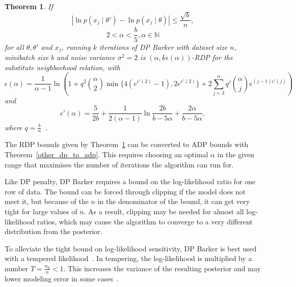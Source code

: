 \documentclass[english,twoside,openright]{HYgraduMLDS}
\newtheorem{theorem}[lemma]{Theorem}
\newcommand{\N}{\mathbb{N}}
\begin{document}
\begin{theorem}\label{dp_barker_theorem}
    If
    \[
        |\ln p(x_j\mid \theta') - \ln p(x_j\mid \theta)| \leq \frac{\sqrt{b}}{n},
    \]
    \[
        2 < \alpha < \frac{b}{5}, \alpha \in \N
    \]
    for all \(\theta, \theta'\) and \(x_{j}\),
    running \(k\) iterations of DP Barker with dataset size \(n\),
    minibatch size \(b\) and noise variance \(\sigma^{2} = 2\)
    is \((\alpha, k\epsilon(\alpha))\)-RDP for the substitute neighborhood
    relation, with
    \[
        \epsilon(\alpha) = \frac{1}{\alpha - 1}\ln \left(
        1 + q^2\binom{\alpha}{2}\min\{4(e^{\epsilon'(2)} - 1), 2e^{\epsilon'(2)}\}
        + 2 \sum_{j=3}^\alpha q^j\binom{\alpha}{j}e^{(j-1)\epsilon'(j)}\right)
    \]
    and 
    \[
        \epsilon'(\alpha) = \frac{5}{2b} + \frac{1}{2(\alpha - 1)}
        \ln \frac{2b}{b - 5\alpha} + \frac{2\alpha}{b - 5\alpha},
    \]
    where \(q = \frac{b}{n}\)~\cite{HeikkilaJDH19}.
\end{theorem}
The RDP bounds given by Theorem~\ref{dp_barker_theorem} can be converted to
ADP bounds with Theorem~\ref{other_dp_to_adp}. This requires choosing an
optimal \(\alpha\) in the given range that maximises the number of iterations
the algorithm can run for.


Like DP penalty, DP Barker requires a bound on the log-likelihood ratio for
one row of data. The bound can be forced through clipping if the model does not 
meet it, but because of the \(n\) in the denominator of the bound, it can get 
very tight for large values of \(n\). As a result, clipping may be needed for 
almost all log-likelihood ratios, which may cause the algorithm to converge
to a very different distribution from the posterior.

To alleviate the tight bound on log-likelihood sensitivity, DP Barker is best
used with a tempered likelihood~\cite{HeikkilaJDH19}. In tempering, the 
log-likelihood is multiplied by a number \(T = \frac{n_0}{n} < 1\). This
increases the variance of the resulting posterior and may lower modeling 
error in some cases~\cite{HeikkilaJDH19}.
\end{document}
